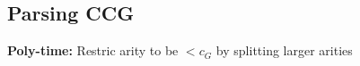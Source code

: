 \subsection{Parsing CCG}
\begin{comment}
	The parsing can be seen as deductive process, the parsing algorithm can be seen as deduction system.
	A grammatical deduction system is defined by a set of rules of inference and a set of axioms.\\
\end{comment} 

\textbf{Poly-time:} Restric arity to be $< c_G$ by splitting larger arities\\
